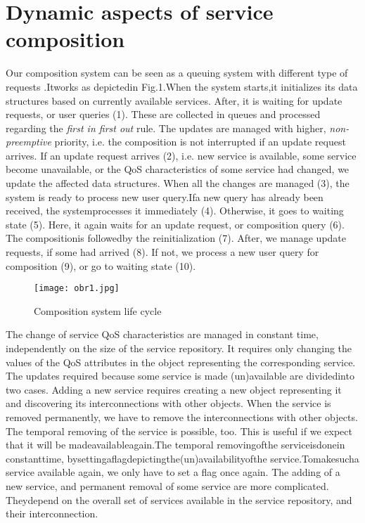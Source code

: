 \documentclass{llncs}
\begin{document}
\clearpage

\section{Dynamic aspects of service composition }


Our composition system can be seen as a queuing system with different type of requests 
\cite{1}.Itworks as depictedin Fig.1.When the system starts,it initializes its 
data structures based on currently available services. After, it is waiting for update 
requests, or user queries (1). These are collected in queues and processed regarding 
the\textit{ first in first out} rule. The updates are managed with higher,\textit{ non-preemptive }priority, 
i.e. the composition is not interrupted if an update request arrives. If an update 
request arrives (2), i.e. new service is available, some service become unavailable, 
or the QoS characteristics of some service had changed, we update the affected data 
structures. When all the changes are managed (3), the system is ready to process 
new user query.Ifa new query has already been received, the systemprocesses it 
immediately (4). Otherwise, it goes to waiting state (5). Here, it again waits for an 
update request, or composition query (6). The compositionis followedby the reinitialization 
(7). After, we manage update requests, if some had arrived (8). If not, we 
process a new user query for composition (9), or go to waiting state (10). 

\begin{figure}[h]

\texttt{[image: obr1.jpg]}

\caption{Composition system life cycle} %
\end{figure}

The change of service QoS characteristics are managed in constant time, independently 
on the size of the service repository. It requires only changing the values 
of the QoS attributes in the object representing the corresponding service. The 
updates required because some service is made (un)available are dividedinto two 
cases. Adding a new service requires creating a new object representing it and discovering 
its interconnections with other objects. When the service is removed permanently, 
we have to remove the interconnections with other objects. The temporal 
removing of the service is possible, too. This is useful if we expect that it will be 
madeavailableagain.The temporal removingofthe serviceisdonein constanttime, 
bysettingaflagdepictingthe(un)availabilityofthe service.Tomakesucha service 
available again, we only have to set a flag once again. The adding of a new service, 
and permanent removal of some service are more complicated. Theydepend on the 
overall set of services available in the service repository, and their interconnection. 
\end{document}
